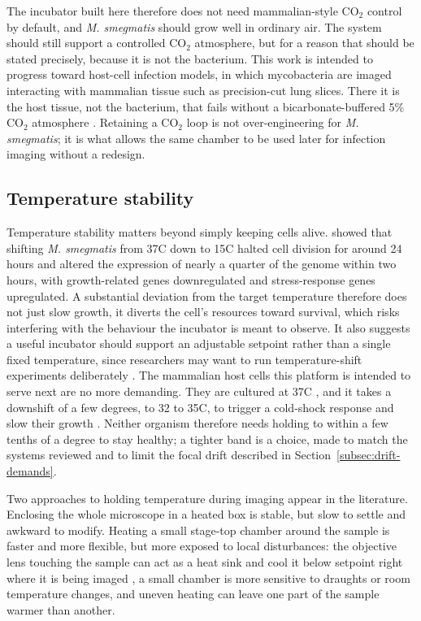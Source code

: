 The incubator built here therefore does not need mammalian-style CO$_2$ control by default, and \textit{M. smegmatis} should grow well in ordinary air. The system should still support a controlled CO$_2$ atmosphere, but for a reason that should be stated precisely, because it is not the bacterium. This work is intended to progress toward host-cell infection models, in which mycobacteria are imaged interacting with mammalian tissue such as precision-cut lung slices. There it is the host tissue, not the bacterium, that fails without a bicarbonate-buffered 5\% CO$_2$ atmosphere \citep{nazarova_growing_2017,frigault_live-cell_2009}. Retaining a CO$_2$ loop is not over-engineering for \textit{M. smegmatis}; it is what allows the same chamber to be used later for infection imaging without a redesign.

\subsection{Temperature stability}
\label{subsec:temp-stability}

Temperature stability matters beyond simply keeping cells alive. \citet{grigorov_dynamic_2023} showed that shifting \textit{M. smegmatis} from 37\textdegree{}C down to 15\textdegree{}C halted cell division for around 24 hours and altered the expression of nearly a quarter of the genome within two hours, with growth-related genes downregulated and stress-response genes upregulated. A substantial deviation from the target temperature therefore does not just slow growth, it diverts the cell's resources toward survival, which risks interfering with the behaviour the incubator is meant to observe. It also suggests a useful incubator should support an adjustable setpoint rather than a single fixed temperature, since researchers may want to run temperature-shift experiments deliberately \citep{grigorov_dynamic_2023}. The mammalian host cells this platform is intended to serve next are no more demanding. They are cultured at 37\textdegree{}C \citep{frigault_live-cell_2009}, and it takes a downshift of a few degrees, to 32 to 35\textdegree{}C, to trigger a cold-shock response and slow their growth \citep{alfageeh_cold_2006}. Neither organism therefore needs holding to within a few tenths of a degree to stay healthy; a tighter band is a choice, made to match the systems reviewed and to limit the focal drift described in Section~\ref{subsec:drift-demands}.

Two approaches to holding temperature during imaging appear in the literature. Enclosing the whole microscope in a heated box is stable, but slow to settle and awkward to modify. Heating a small stage-top chamber around the sample is faster and more flexible, but more exposed to local disturbances: the objective lens touching the sample can act as a heat sink and cool it below setpoint right where it is being imaged \citep{frigault_live-cell_2009}, a small chamber is more sensitive to draughts or room temperature changes, and uneven heating can leave one part of the sample warmer than another.

